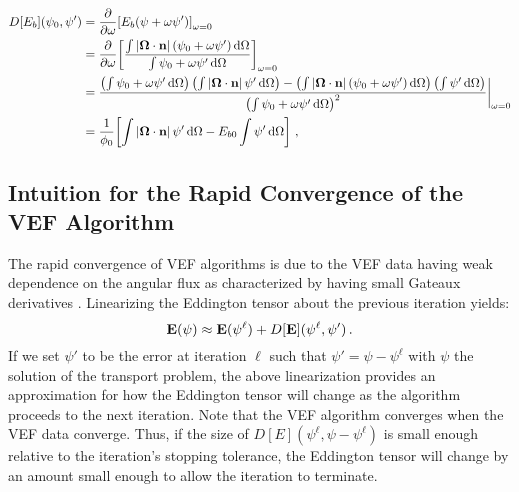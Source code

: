 \documentclass[../doc.tex]{subfiles}
\begin{document}
	\begin{equation} \label{vef:Eb_deriv}
	\begin{aligned}
		D[E_b](\psi_0,\psi') &= \pderiv{}{\omega}\bracket{E_b(\psi + \omega\psi')}_{\omega=0} \\ 
		&= \pderiv{}{\omega}\bracket{\frac{\int |\Omegahat\cdot\n|\paren{\psi_0 + \omega\psi'} \ud \Omega}{\int \psi_0 + \omega\psi' \ud \Omega}}_{\omega=0} \\
		&= \frac{\paren{\int \psi_0 + \omega\psi' \ud \Omega}\paren{\int |\Omegahat\cdot\n|\,\psi'\ud\Omega} - \paren{\int |\Omegahat\cdot\n|\paren{\psi_0 + \omega\psi'}\ud\Omega}\paren{\int\psi'\ud\Omega}}{\paren{\int \psi_0 + \omega\psi' \ud \Omega}^2} \biggr\rvert_{\omega=0} \\
		&= \frac{1}{\phi_0}\bracket{\int |\Omegahat\cdot\n|\,\psi' \ud \Omega - E_{b0} \int \psi' \ud \Omega} \,,
	\end{aligned}
	\end{equation}

\subsection{Intuition for the Rapid Convergence of the VEF Algorithm}
The rapid convergence of VEF algorithms is due to the VEF data having weak dependence on the angular flux as characterized by having small Gateaux derivatives \cite{goldin}. Linearizing the Eddington tensor about the previous iteration yields: 
	\begin{equation} \label{vef:edd_lin}
		\boldsymbol{\mathrm{E}}(\psi) \approx \boldsymbol{\mathrm{E}}(\psi^\ell) + D[\boldsymbol{\mathrm{E}}](\psi^\ell,\psi') \,. 
	\end{equation}
If we set $\psi'$ to be the error at iteration $\ell$ such that $\psi' = \psi - \psi^\ell$ with $\psi$ the solution of the transport problem, the above linearization provides an approximation for how the Eddington tensor will change as the algorithm proceeds to the next iteration. Note that the VEF algorithm converges when the VEF data converge. Thus, if the size of $D[E](\psi^\ell,\psi - \psi^\ell)$ is small enough relative to the iteration's stopping tolerance, the Eddington tensor will change by an amount small enough to allow the iteration to terminate. 
\end{document}
